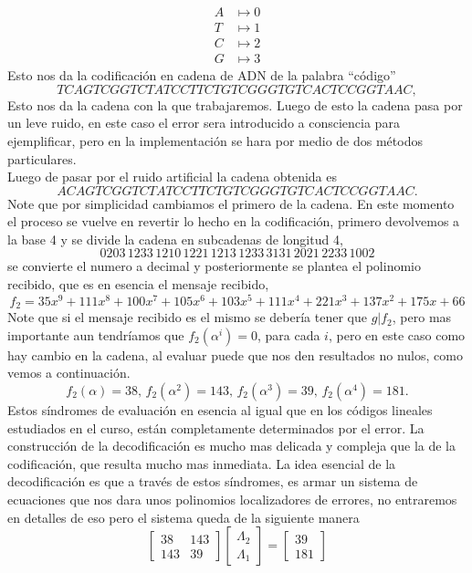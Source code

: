 \begin{align*}
    A&\mapsto 0\\
    T&\mapsto 1\\
    C&\mapsto 2\\
    G&\mapsto 3
\end{align*}
Esto nos da la codificación en cadena de ADN de la palabra ``código''\\
$$TCAGTCGGTCTATCCTTCTGTCGGGTGTCACTCCGGTAAC,$$
Esto nos da la cadena con la que trabajaremos. Luego de esto la cadena pasa por un leve ruido, en este caso el error sera introducido a consciencia  para ejemplificar, pero en la implementación se hara por medio de dos métodos particulares.\\

Luego de pasar por el ruido artificial la cadena obtenida es
$$ACAGTCGGTCTATCCTTCTGTCGGGTGTCACTCCGGTAAC.$$
Note que por simplicidad cambiamos el primero de la cadena.
En este momento el proceso se vuelve en revertir lo hecho en la codificación, primero devolvemos a la base 4 y se divide la cadena en subcadenas de longitud 4,
$$0203\,1233\,1210\,1221\,1213\,1233\,3131\,2021\,2233\,1002$$ se convierte el numero a decimal y posteriormente se plantea el polinomio recibido, que es en esencia el mensaje recibido,
$$f_2=35x^9+111x^8+100x^7+105x^6+103x^5+111x^4+221x^3+137x^2+175x+66$$
Note que si el mensaje recibido es el mismo se debería tener que $g|f_2$, pero mas importante aun tendríamos que $f_2(\alpha^i)=0$, para cada $i$, pero en este caso como hay cambio en la cadena, al evaluar puede que nos den resultados no nulos, como vemos a continuación.
$$f_2(\alpha)=38,\,f_2(\alpha^2)=143,\,f_2(\alpha^3)=39,\,f_2(\alpha^4)=181.$$
Estos síndromes de evaluación en esencia al igual que en los códigos lineales estudiados en el curso, están completamente determinados por el error. La construcción de la decodificación es mucho mas delicada y compleja que la de la codificación, que resulta mucho mas inmediata. La idea esencial de la decodificación es que a través de estos síndromes, es armar un sistema de ecuaciones que nos dara unos polinomios localizadores de errores, no entraremos en detalles de eso pero el sistema queda de la siguiente manera
$$\begin{bmatrix}
    38 & 143\\
    143 & 39
\end{bmatrix}\begin{bmatrix}
    \Lambda_2\\
    \Lambda_1
\end{bmatrix}=\begin{bmatrix}
    39\\
    181
\end{bmatrix}$$
